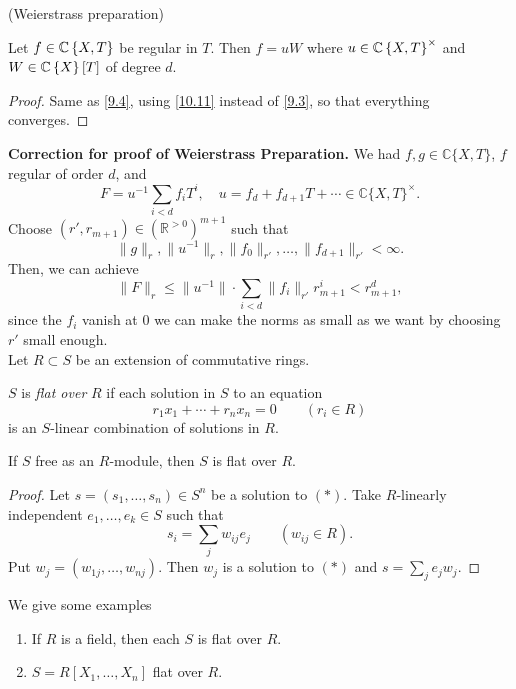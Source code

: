 \begin{cor*}
\label{10.12} (Weierstrass preparation)

Let $f\in\mathbb{C}\left\{ X,T\right\} $ be regular in $T$. Then $f=uW$
where $u\in\mathbb{C}\left\{ X,T\right\} ^{\times}$ and $W\in\mathbb{C}\left\{ X\right\} \left[T\right]$
of degree $d$.\end{cor*}
\begin{proof}
Same as \eqref{9.4}, using \eqref{10.11} instead of \eqref{9.3}, so that everything
converges.\end{proof}


\textbf{Correction for proof of Weierstrass Preparation.} We had $f, g\in \mathds{C}\{X, T\}$, $f$ regular of order $d$, and
$$F=u^{-1}\sum_{i<d}f_iT^i, \quad u=f_d + f_{d+1}T+ \cdots \in \mathds{C}\{X, T\}^\times.$$
Choose $(r', r_{m+1})\in (\mathds{R}^{>0})^{m+1}$ such that
$$\|g\|_r, \|u^{-1}\|_r, \|f_0\|_{r'}, \dots, \|f_{d+1}\|_{r'}<\infty.$$
Then, we can achieve
$$\|F\|_r\leq \|u^{-1}\|\cdot \sum_{i<d}\|f_i\|_{r'}r^i_{m+1}<r^d_{m+1},$$
since the $f_i$ vanish at $0$ we can make the norms as small as we want by choosing $r'$ small enough.\\

Let $R\subset S$ be an extension of commutative rings.

\begin{definition} $S$ is \textit{flat over} $R$ if each solution in $S$ to an equation
\begin{equation} r_1x_1+\cdots + r_n x_n=0 \qquad (r_i\in R) \tag{$*$}\end{equation}
is an $S$-linear combination of solutions in $R$. \end{definition}

\begin{lemma} If $S$ free as an $R$-module, then $S$ is flat over $R$. \end{lemma}

\begin{proof} Let $s=(s_1, \dots, s_n)\in S^n$ be a solution to $(*)$.  Take $R$-linearly independent $e_1, \dots, e_k\in S$ such that
$$s_i=\sum_j w_{ij} e_j \qquad (w_{ij}\in R).$$
Put $w_j=(w_{1j}, \dots, w_{nj})$.  Then $w_j$ is a solution to $(*)$ and $s=\sum_j e_jw_j.$
\end{proof}

We give some examples
\begin{enumerate}%
\item If $R$ is a field, then each $S$ is flat over $R$.  
\item $S=R[X_1, \dots, X_n]$ flat over $R$.
\end{enumerate}

